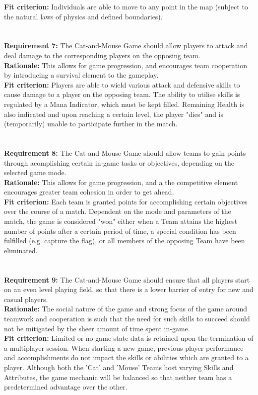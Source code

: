 \documentclass[12pt, titlepage]{article}
\begin{document}
\textbf{Fit criterion:}  Individuals are able to move to any point in the map (subject to the natural laws of physics and defined boundaries).\\
\\\\
\textbf{Requirement 7:}  The Cat-and-Mouse Game should allow players to attack and deal damage to the corresponding players on the opposing team. \\
\textbf{Rationale:}  This allows for game progression, and encourages team cooperation by introducing a survival element to the gameplay.\\
\textbf{Fit criterion:}  Players are able to wield various attack and defensive skills to cause damage to a player on the opposing team. The ability to utilise  skills is regulated by a Mana Indicator, which must be kept filled. Remaining Health is also indicated and upon reaching a certain level, the player "dies" and is (temporarily) unable to participate further in the match.\\
\\\\
\textbf{Requirement 8:}  The Cat-and-Mouse Game should allow teams to gain points through acomplishing certain in-game tasks or objectives, depending on the selected game mode.\\
\textbf{Rationale:}  This allows for game progression, and a the competitive element encourages greater team cohesion in order to get ahead.\\
\textbf{Fit criterion:}  Each team is granted points for accomplishing certain objectives over the course of a match. Dependent on the mode and parameters of the match, the game is considered "won" either when a Team attains the highest number of points after a certain period of time, a special condition has been fulfilled (e.g. capture the flag), or all members of the opposing Team have been eliminated.  \\
\\\\
\textbf{Requirement 9:}  The Cat-and-Mouse Game should ensure that all players start on an even level playing field, so that there is a lower barrier of entry for new and casual players.\\
\textbf{Rationale:}  The social nature of the game and strong focus of the game around teamwork and cooperation is such that the need for such skills to succeed should not be mitigated by the sheer amount of time spent in-game.\\
\textbf{Fit criterion:}  Limited or no game state data is retained upon the termination of a multiplayer session. When starting a new game, previous player performance and accomplishments do not impact the skills or abilities which are granted to a player. Although both the 'Cat' and 'Mouse' Teams host varying Skills and Attributes, the game mechanic will be balanced so that neither team has a predetermined advantage over the other.\\
\end{document}
